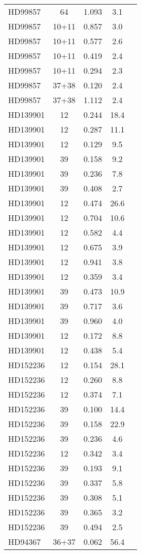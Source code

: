 \begin{table*}
\begin{tabular}{l c c c c}
HD99857 & 64 & 1.093 & 3.1\\ 
HD99857 & 10+11 & 0.857 & 3.0\\ 
HD99857 & 10+11 & 0.577 & 2.6\\ 
HD99857 & 10+11 & 0.419 & 2.4\\ 
HD99857 & 10+11 & 0.294 & 2.3\\ 
HD99857 & 37+38 & 0.120 & 2.4\\ 
HD99857 & 37+38 & 1.112 & 2.4\\ 
\hline
HD139901 & 12 & 0.244 & 18.4\\ 
HD139901 & 12 & 0.287 & 11.1\\ 
HD139901 & 12 & 0.129 & 9.5\\ 
HD139901 & 39 & 0.158 & 9.2\\ 
HD139901 & 39 & 0.236 & 7.8\\ 
HD139901 & 39 & 0.408 & 2.7\\ 
HD139901 & 12 & 0.474 & 26.6\\ 
HD139901 & 12 & 0.704 & 10.6\\ 
HD139901 & 12 & 0.582 & 4.4\\ 
HD139901 & 12 & 0.675 & 3.9\\ 
HD139901 & 12 & 0.941 & 3.8\\ 
HD139901 & 12 & 0.359 & 3.4\\ 
HD139901 & 39 & 0.473 & 10.9\\ 
HD139901 & 39 & 0.717 & 3.6\\ 
HD139901 & 39 & 0.960 & 4.0\\ 
HD139901 & 12 & 0.172 & 8.8\\ 
HD139901 & 12 & 0.438 & 5.4\\ 
\hline
HD152236 & 12 & 0.154 & 28.1\\ 
HD152236 & 12 & 0.260 & 8.8\\ 
HD152236 & 12 & 0.374 & 7.1\\ 
HD152236 & 39 & 0.100 & 14.4\\ 
HD152236 & 39 & 0.158 & 22.9\\ 
HD152236 & 39 & 0.236 & 4.6\\ 
HD152236 & 12 & 0.342 & 3.4\\ 
HD152236 & 39 & 0.193 & 9.1\\ 
HD152236 & 39 & 0.337 & 5.8\\ 
HD152236 & 39 & 0.308 & 5.1\\ 
HD152236 & 39 & 0.365 & 3.2\\ 
HD152236 & 39 & 0.494 & 2.5\\ 
\hline
HD94367 & 36+37 & 0.062 & 56.4\\ 

\end{tabular}
\end{table*}
